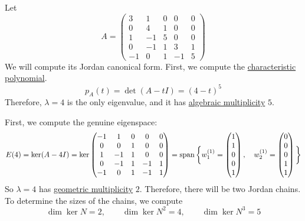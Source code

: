 	\begin{example}
	  \label{ex:jnf-with-two-nontrivial-jordan-chains}
		Let
		\begin{equation}
			A =
			\begin{pmatrix}
				3 & 1 & 0 & 0 & 0 \\
				0 & 4 & 1 & 0 & 0 \\
				1 & -1 & 5 & 0 & 0 \\
				0 & -1 & 1 & 3 & 1 \\
				-1 & 0 & 1 & -1 & 5
			\end{pmatrix}
		\end{equation}
		We will compute its Jordan canonical form. First, we compute the \hyperref[def:characteristic-polynomial]{characteristic polynomial}.
		\begin{equation}
			p_A(t) = \det(A - tI) = (4 - t)^5
		\end{equation}
		Therefore, $\lambda = 4$ is the only eigenvalue, and it has \hyperref[def:algebraic-multiplicity]{algebraic multiplicity} $5$.

		First, we compute the genuine eigenspace:
		\begin{equation}
			E(4) = \ker(A - 4I) = \ker \begin{pmatrix}
				-1 & 1 & 0 & 0 & 0 \\
				0 & 0 & 1 & 0 & 0 \\
				1 & -1 & 1 & 0 & 0 \\
				0 & -1 & 1 & -1 & 1 \\
				-1 & 0 & 1 & -1 & 1
			\end{pmatrix} = \operatorname{span} \bigg\{
			w_1^{(1)} =
			\begin{pmatrix}
				1 \\
				1 \\
				0 \\
				0 \\
				1
			\end{pmatrix},
			\quad
			w_2^{(1)} =
			\begin{pmatrix}
				0 \\
				0 \\
				0 \\
				1 \\
				1
			\end{pmatrix}
			\bigg\}
		\end{equation}
		So $\lambda = 4$ has \hyperref[def:geometric-multiplicity]{geometric multiplicity} $2$. Therefore, there will be two Jordan chains. To determine the sizes of the chains, we compute
		\begin{equation}
			\dim \ker N = 2, \qquad \dim \ker N^2 = 4, \qquad \dim \ker N^3 = 5
		\end{equation}


\end{example}
